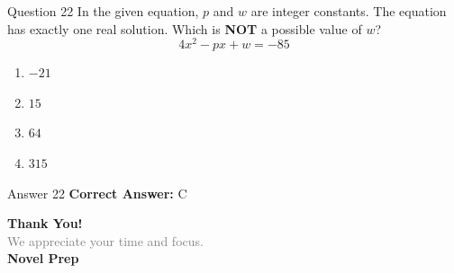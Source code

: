 \documentclass{beamer}
\begin{document}
\begin{frame}{Question 22}
\small
In the given equation, \(p\) and \(w\) are integer constants. The equation has
exactly one real solution. Which is \textbf{NOT} a possible value of \(w\)?
\[
4x^2-px+w=-85
\]
\vspace{0.35cm}
\begin{enumerate}
    \item[A.] \(-21\)
    \item[B.] \(15\)
    \item[C.] \(64\)
    \item[D.] \(315\)
\end{enumerate}
\end{frame}
\begin{frame}{Answer 22}
\small
\textbf{Correct Answer:} C
\end{frame}

\begin{frame}{}
    \centering
    \vspace{5em}
    {\Huge \textbf{\textcolor{novelPurple}{Thank You!}}} \\[1em]
    {\large \textcolor{gray}{We appreciate your time and focus.}} \\[3em]
    {\LARGE \textbf{\textcolor{novelPurple}{\textsf{Novel Prep}}}}
    \vfill
\end{frame}
\end{document}
